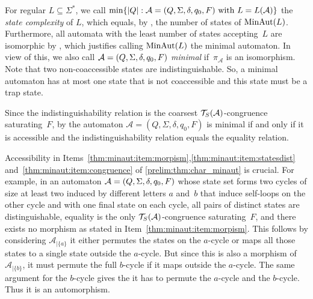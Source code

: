 For regular $L \subseteq \Sigma^*$, we call $\min\{ |Q| : \mathcal A = (Q, \Sigma, \delta, q_0, F) \text{ with } L = L(\mathcal A)\}$
the \emph{state complexity} of $L$,
which equals, by ,
the number of states of $\operatorname{MinAut}(L)$.
Furthermore, all automata with the least number of states
accepting~$L$ are isomorphic by	, which justifies calling $\operatorname{MinAut}(L)$
the minimal automaton. 
In view of this, we 
also call $\mathcal A = (Q, \Sigma, \delta, q_0, F)$ \emph{minimal}
if~$\pi_{\mathcal A}$ is an isomorphism.
Note that two non-coaccessible states are indistinguishable. So, a minimal automaton has at most one
state that is not coaccessible and this state must be a trap state.

\begin{remark}
	Since the indistinguishability relation
	is the coarsest $\mathcal T_S(\mathcal A)$-congruence saturating~$F$,
	by 
	the automaton 	$\mathcal A = (Q,\Sigma,\delta,q_0,F)$ is minimal if and only if it is accessible
	and the indistinguishability relation equals the equality relation.
\end{remark}

\begin{remark}
 Accessibility in Items~\ref{thm:minaut:item:morpism},\ref{thm:minaut:item:statesdist} and~\ref{thm:minaut:item:congruence} 
 of \cref{prelim:thm:char_minaut} 
 is crucial. For example, in an automaton $\mathcal A = (Q, \Sigma, \delta, q_0, F)$
 whose state set forms two cycles of size at least two induced by different letters $a$ and~$b$ that induce self-loops on the other cycle
 and with one final state on each cycle, all pairs of distinct states are distinguishable,
 equality is the only $\mathcal T_S(\mathcal A)$-congruence saturating~$F$,
 and there exists no morphism as stated in Item~\ref{thm:minaut:item:morpism}.
 This follows by considering $\mathcal A_{|\{a\}}$
 it either permutes the states on the $a$-cycle or maps all those states
 to a single state outside the $a$-cycle. But since this is also a morphism of $\mathcal A_{|\{b\}}$,
 it must permute the full $b$-cycle if it maps outside the $a$-cycle.
 The same argument for the $b$-cycle gives the it has to permute
 the $a$-cycle and the $b$-cycle.
 Thus it is an automorphism.
\end{remark}

